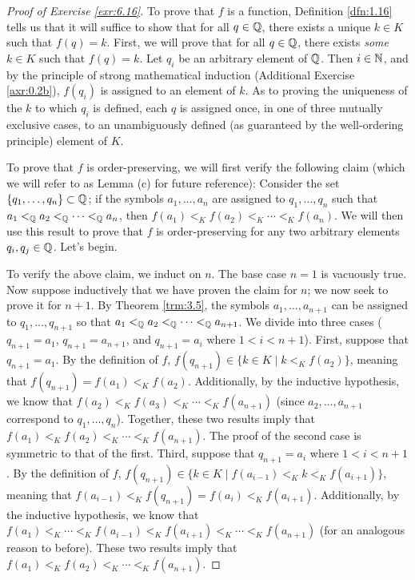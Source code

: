 \documentclass[../main.tex]{subfiles}
\begin{document}
\begin{exercise}
\begin{proof}[Proof of Exercise \ref{exr:6.16}]
        To prove that $f$ is a function, Definition \ref{dfn:1.16} tells us that it will suffice to show that for all $q\in\mathbb{Q}$, there exists a unique $k\in K$ such that $f(q)=k$. First, we will prove that for all $q\in\mathbb{Q}$, there exists \emph{some} $k\in K$ such that $f(q)=k$. Let $q_i$ be an arbitrary element of $\mathbb{Q}$. Then $i\in\mathbb{N}$, and by the principle of strong mathematical induction (Additional Exercise \ref{axr:0.2b}), $f(q_i)$ is assigned to an element of $k$. As to proving the uniqueness of the $k$ to which $q_i$ is defined, each $q$ is assigned once, in one of three mutually exclusive cases, to an unambiguously defined (as guaranteed by the well-ordering principle) element of $K$.\par\smallskip
        To prove that $f$ is order-preserving, we will first verify the following claim (which we will refer to as Lemma (c) for future reference): Consider the set $\{q_1,\dots,q_n\}\subset\mathbb{Q}$; if the symbols $a_1,\dots,a_n$ are assigned to $q_1,\dots,q_n$ such that $a_1<_{\mathbb{Q}} a_2<_{\mathbb{Q}}\cdots<_{\mathbb{Q}} a_n$, then $f(a_1)<_Kf(a_2)<_K\cdots<_Kf(a_n)$. We will then use this result to prove that $f$ is order-preserving for any two arbitrary elements $q_i,q_j\in\mathbb{Q}$. Let's begin.\par
        To verify the above claim, we induct on $n$. The base case $n=1$ is vacuously true. Now suppose inductively that we have proven the claim for $n$; we now seek to prove it for $n+1$. By Theorem \ref{trm:3.5}, the symbols $a_1,\dots,a_{n+1}$ can be assigned to $q_1,\dots,q_{n+1}$ so that $a_1<_{\mathbb{Q}} a_2<_{\mathbb{Q}} \cdots<_{\mathbb{Q}} a_{n+1}$. We divide into three cases ($q_{n+1}=a_1$, $q_{n+1}=a_{n+1}$, and $q_{n+1}=a_i$ where $1<i<n+1$). First, suppose that $q_{n+1}=a_1$. By the definition of $f$, $f(q_{n+1})\in\{k\in K\mid k<_Kf(a_2)\}$, meaning that $f(q_{n+1})=f(a_1)<_Kf(a_2)$. Additionally, by the inductive hypothesis, we know that $f(a_2)<_Kf(a_3)<_K\cdots<_Kf(a_{n+1})$ (since $a_2,\dots,a_{n+1}$ correspond to $q_1,\dots,q_n$). Together, these two results imply that $f(a_1)<_Kf(a_2)<_K\cdots<_Kf(a_{n+1})$. The proof of the second case is symmetric to that of the first. Third, suppose that $q_{n+1}=a_i$ where $1<i<n+1$. By the definition of $f$, $f(q_{n+1})\in\{k\in K\mid f(a_{i-1})<_Kk<_Kf(a_{i+1})\}$, meaning that $f(a_{i-1})<_Kf(q_{n+1})=f(a_i)<_Kf(a_{i+1})$. Additionally, by the inductive hypothesis, we know that $f(a_1)<_K\cdots<_Kf(a_{i-1})<_Kf(a_{i+1})<_K\cdots<_Kf(a_{n+1})$ (for an analogous reason to before). These two results imply that $f(a_1)<_Kf(a_2)<_K\cdots<_Kf(a_{n+1})$.\par

\end{proof}
\end{exercise}
\end{document}
